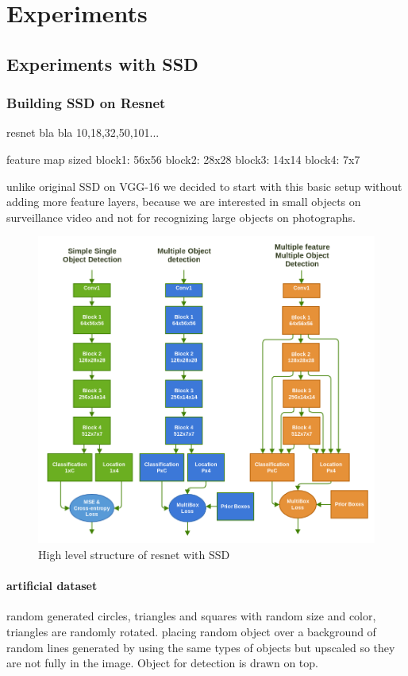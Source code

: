 \chapter{Experiments}

\section{Experiments with SSD}
\label{chapt:improvemnets}

\subsection{Building SSD on Resnet}
resnet
bla bla 10,18,32,50,101...

feature map sized
block1: 56x56
block2: 28x28
block3: 14x14
block4: 7x7

unlike original SSD on VGG-16 we decided to start with this basic setup without adding more feature layers, because we are interested in small objects on surveillance video and not for recognizing large objects on photographs.

\begin{figure}
    \centering
    \includegraphics[width=\textwidth]{img/resnets.png}
    \caption{High level structure of resnet with SSD}
    \label{fig:resnet}
\end{figure}




\subsubsection{artificial dataset}
random generated circles, triangles and squares with random size and color, triangles are randomly rotated. placing random object over a background of random lines generated by using the same types of objects but upscaled so they are not fully in the image. Object for detection is drawn on top. 

